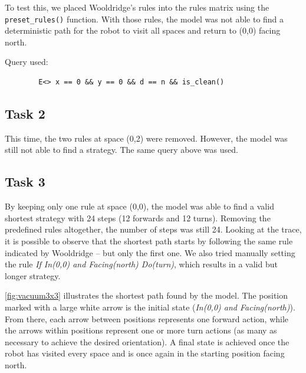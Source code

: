 \documentclass[11pt]{article}
\begin{document}
To test this, we placed Wooldridge's rules into the rules matrix using the \texttt{preset\_rules()} function. With those rules, the model was not able to find a deterministic path for the robot to visit all spaces and return to (0,0) facing north.

Query used:
    \begin{verbatim}
    	E<> x == 0 && y == 0 && d == n && is_clean()
    \end{verbatim}

\subsection*{Task 2}

This time, the two rules at space (0,2) were removed.
However, the model was still not able to find a strategy.
The same query above was used.

\subsection*{Task 3}

By keeping only one rule at space (0,0), the model was able to find a valid shortest strategy with 24 steps (12 forwards and 12 turns).
Removing the predefined rules altogether, the number of steps was still 24.
Looking at the trace, it is possible to observe that the shortest path starts by following the same rule indicated by Wooldridge -- but only the first one.
We also tried manually setting the rule \textit{If In(0,0) and Facing(north) Do(turn)}, which results in a valid but longer strategy.

\autoref{fig:vacuum3x3} illustrates the shortest path found by the model.
The position marked with a large white arrow is the initial state (\textit{In(0,0) and Facing(north)}).
From there, each arrow between positions represents one forward action, while the arrows within positions represent one or more turn actions (as many as necessary to achieve the desired orientation).
A final state is achieved once the robot has visited every space and is once again in the starting position facing north.
\end{document}
